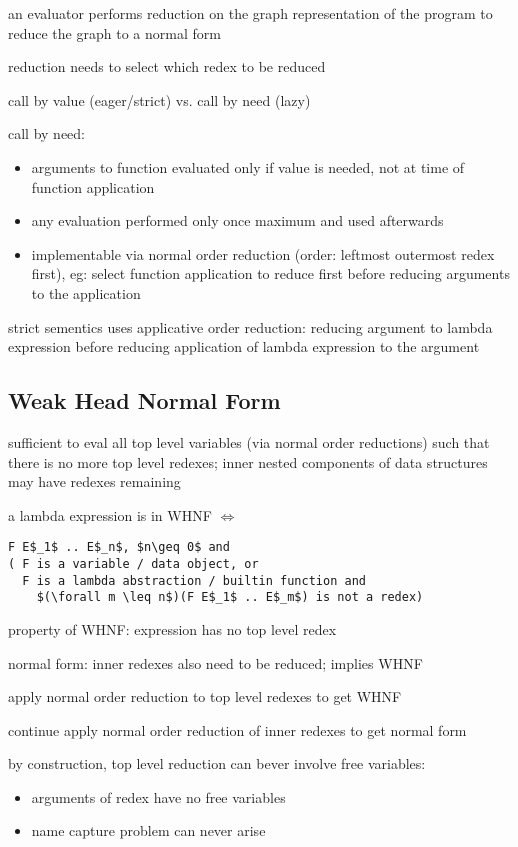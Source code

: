 \documentclass[8pt]{extarticle}
\begin{document}
\begin{multicols*}{2}
an evaluator performs reduction on the graph representation of the program to reduce the graph to a normal form

reduction needs to select which redex to be reduced

call by value (eager/strict) vs. call by need (lazy)

call by need:
\begin{itemize}
\item arguments to function evaluated only if value is needed, not at time of function application
\item any evaluation performed only once maximum and used afterwards
\item implementable via normal order reduction (order: leftmost outermost redex first), eg: select function application to reduce first before reducing arguments to the application
\end{itemize}

strict sementics uses applicative order reduction: reducing argument to lambda expression before reducing application of lambda expression to the argument

\subsection{Weak Head Normal Form}

sufficient to eval all top level variables (via normal order reductions) such that there is no more top level redexes; inner nested components of data structures may have redexes remaining

a lambda expression is in WHNF $\iff$
\begin{lstlisting}
F E$_1$ .. E$_n$, $n\geq 0$ and
( F is a variable / data object, or
  F is a lambda abstraction / builtin function and
    $(\forall m \leq n$)(F E$_1$ .. E$_m$) is not a redex)
\end{lstlisting}

property of WHNF: expression has no top level redex

normal form: inner redexes also need to be reduced; implies WHNF

apply normal order reduction to top level redexes to get WHNF

continue apply normal order reduction of inner redexes to get normal form

by construction, top level reduction can bever involve free variables:
\begin{itemize}
\item arguments of redex have no free variables
\item name capture problem can never arise
\end{itemize}


\end{multicols*}
\end{document}
